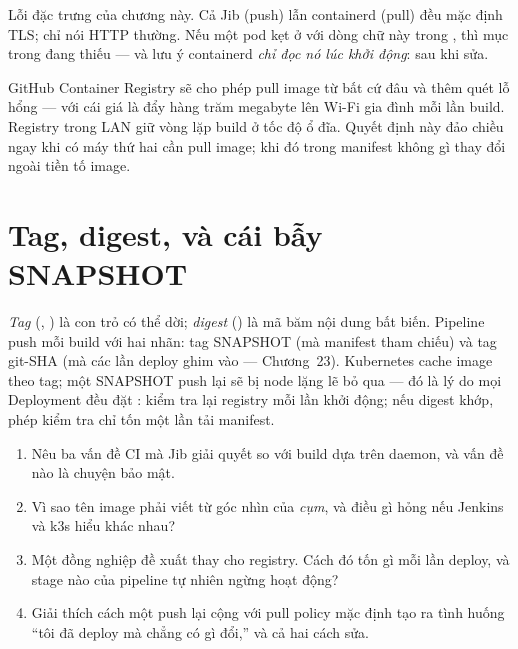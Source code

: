 \begin{pitfall}
Lỗi đặc trưng của chương này. Cả Jib (push) lẫn containerd (pull) đều
mặc định TLS;  chỉ nói HTTP thường. Nếu một pod kẹt ở
 với dòng chữ này trong
, thì mục trong  đang
thiếu --- và lưu ý containerd \emph{chỉ đọc nó lúc khởi động}:
 sau khi sửa.
\end{pitfall}

\begin{decision}
GitHub Container Registry sẽ cho phép pull image từ bất cứ đâu và thêm
quét lỗ hổng --- với cái giá là đẩy hàng trăm megabyte lên Wi-Fi gia
đình mỗi lần build. Registry trong LAN giữ vòng lặp build ở tốc độ ổ
đĩa. Quyết định này đảo chiều ngay khi có máy thứ hai cần pull image;
khi đó trong manifest không gì thay đổi ngoài tiền tố image.
\end{decision}

\section{Tag, digest, và cái bẫy SNAPSHOT}

\emph{Tag} (, ) là con trỏ có thể
dời; \emph{digest} () là mã băm nội dung bất biến.
Pipeline push mỗi build với hai nhãn: tag SNAPSHOT (mà manifest tham
chiếu) và tag git-SHA (mà các lần deploy ghim vào --- Chương~23).
Kubernetes cache image theo tag; một SNAPSHOT push lại sẽ bị node lặng
lẽ bỏ qua --- đó là lý do mọi Deployment đều đặt
: kiểm tra lại registry mỗi lần khởi
động; nếu digest khớp, phép kiểm tra chỉ tốn một lần tải manifest.

\begin{quiz}
\begin{enumerate}
  \item Nêu ba vấn đề CI mà Jib giải quyết so với build dựa trên daemon,
  và vấn đề nào là chuyện bảo mật.
  \item Vì sao tên image phải viết từ góc nhìn của \emph{cụm}, và điều
  gì hỏng nếu Jenkins và k3s hiểu  khác nhau?
  \item Một đồng nghiệp đề xuất 
  thay cho registry. Cách đó tốn gì mỗi lần deploy, và stage nào của
  pipeline tự nhiên ngừng hoạt động?
  \item Giải thích cách một  push lại cộng với
  pull policy mặc định tạo ra tình huống ``tôi đã deploy mà chẳng có gì
  đổi,'' và cả hai cách sửa.
\end{enumerate}
\end{quiz}
